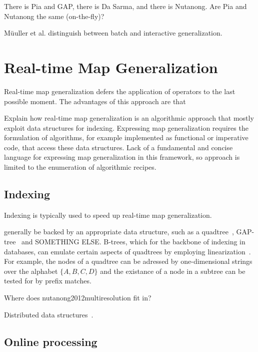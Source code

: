 \documentclass[11pt, oneside]{report}
\begin{document}
There is Pia and GAP, there is Da Sarma, and there is Nutanong. Are Pia and Nutanong the same (on-the-fly)?

M{\"u}uller et al. distinguish between batch and interactive generalization.



\section{Real-time Map Generalization}
Real-time map generalization defers the application of operators to the last possible moment. The advantages of this approach are that 


 
Explain how real-time map generalization is an algorithmic approach that mostly exploit data structures for indexing. Expressing map generalization requires the formulation of algorithms, for example implemented as functional or imperative code, that access these data structures. Lack of a fundamental and concise language for expressing map generalization in this framework, so approach is limited to the enumeration of algorithmic recipes.

\subsection{Indexing}
Indexing is typically used to speed up real-time map generalization.

generally be backed by an appropriate data structure, such as a quadtree~\cite{bereuter2013real}, GAP-tree~\cite{van1995gap} and SOMETHING ELSE. B-trees, which for the backbone of indexing in databases, can emulate certain aspects of quadtrees by employing linearization~\cite{zcurve, hilbertcurve}. For example, the nodes of a quadtree can be adressed by one-dimensional strings over the alphabet $\lbrace A, B, C, D \rbrace$ and the existance of a node in a subtree can be tested for by prefix matches.

Where does nutanong2012multiresolution fit in?

Distributed data structures~\cite{paralleluniverse2012spacebase}.

\subsection{Online processing}
\end{document}
